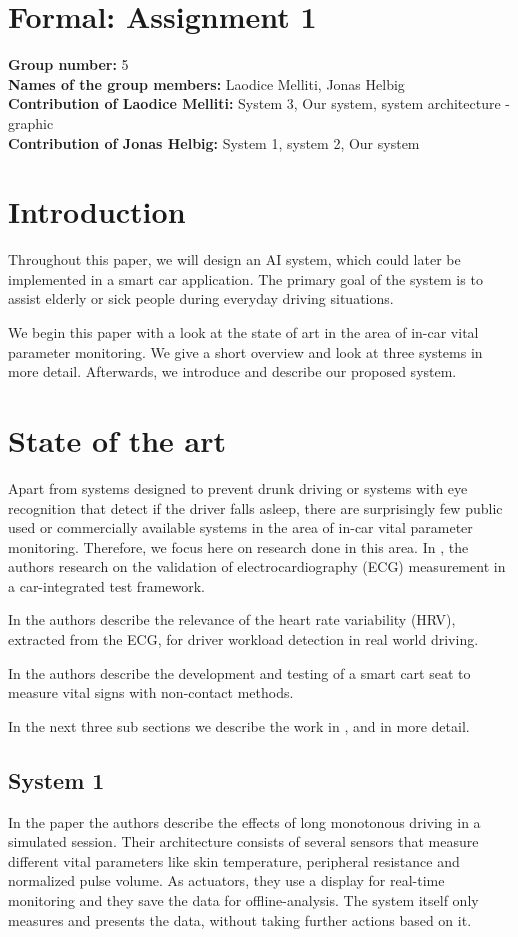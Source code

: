 \section{Formal: Assignment 1}
\textbf{Group number:} 5\\
\textbf{Names of the group members:} Laodice Melliti, Jonas Helbig\\
\textbf{Contribution of Laodice Melliti:} System 3, Our system, system architecture - graphic\\
\textbf{Contribution of Jonas Helbig:} System 1, system 2, Our system \\
\section{Introduction}
\indent					%
\indent Throughout this paper, we will design an AI system, which could later be implemented in a smart car application. The primary goal of the system is to assist elderly or sick people during everyday driving situations.

We begin this paper with a look at  the state of art in the area of in-car vital parameter monitoring. We give a short overview and look at three systems in more detail. Afterwards, we introduce and describe our proposed system.
\section{State of the art}
\indent
\indent Apart from systems designed to prevent drunk driving or systems with eye recognition that detect if the driver falls asleep, there are surprisingly few public used or commercially available systems in the area of in-car vital parameter monitoring. Therefore, we focus here on research done in this area. In \cite{schneider:12}, the authors research on the validation of electrocardiography (ECG) measurement in a car-integrated test framework.

In \cite{eilebrecht:12} the authors describe the relevance of the heart rate variability (HRV), extracted from the ECG, for driver workload detection in real world driving.

In \cite{walter:11} the authors describe the development and testing of a smart cart seat to measure vital signs with non-contact methods.

In the next three sub sections we describe the work in \cite{yamakoshi:07}, \cite{Zocchi:07} and \cite{angelo:10} in more detail.
\subsection{System 1}
\indent
\indent In the paper \cite{yamakoshi:07} the authors describe the effects of long monotonous driving in a simulated session. Their architecture consists of several sensors that measure different vital parameters like skin temperature, peripheral resistance and normalized pulse volume. As actuators, they use a display for real-time monitoring and they save the data for offline-analysis.
The system itself only measures and presents the data, without taking further actions based on it.
